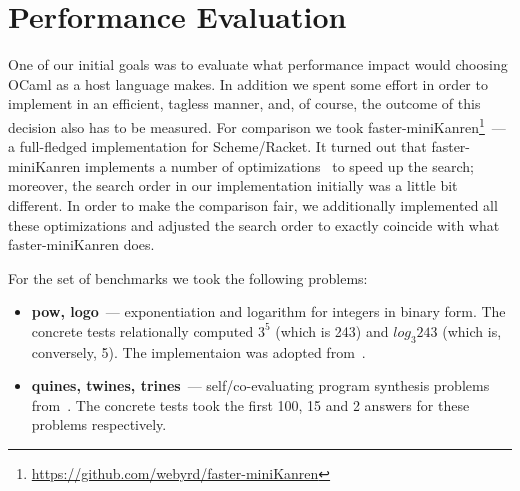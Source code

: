 
\section{Performance Evaluation}
\label{sec:evaluation}

One of our initial goals was to evaluate what performance impact would choosing OCaml as a host language makes. In addition we spent some
effort in order to implement \miniKanren in an efficient, tagless manner, and, of course, the outcome of this decision also has to be
measured. For comparison we took faster-miniKanren\footnote{\url{https://github.com/webyrd/faster-miniKanren}}~--- a full-fledged
\miniKanren implementation for Scheme/Racket. It turned out that faster-miniKanren implements a number of optimizations~\cite{WillThesis, Optimizations}
to speed up the search; moreover, the search order in our implementation initially was a little bit different. In order to make the comparison
fair, we additionally implemented all these optimizations and adjusted the search order to exactly coincide with
what faster-miniKanren does.


\FloatBarrier

For the set of benchmarks we took the following problems:

\begin{itemize}
\item \textbf{pow, logo}~--- exponentiation and logarithm for integers in binary form. The concrete tests relationally computed
$3^5$ (which is 243) and $log_3 243$ (which is, conversely, 5). The implementaion was adopted from~\cite{KiselyovArithm}.
\item \textbf{quines, twines, trines}~--- self/co-evaluating program synthesis problems from~\cite{Untagged}. The
concrete tests took the first 100, 15 and 2 answers for these problems respectively.
\end{itemize}


